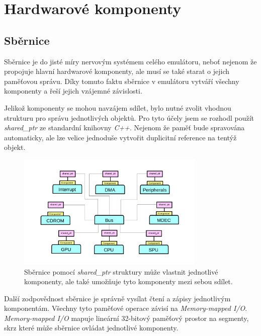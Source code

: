 \chapter{Hardwarové komponenty}

\section{Sběrnice}

Sběrnice je do jisté míry nervovým systémem celého emulátoru, neboť
nejenom že propojuje hlavní hardwarové komponenty, ale musí se také starat
o jejich paměťovou správu. Díky tomuto faktu sběrnice v emulátoru vytváří všechny komponenty
a řeší jejich vzájemné závislosti.

Jelikož komponenty se mohou navzájem sdílet, bylo nutné zvolit vhodnou strukturu
pro správu jednotlivých objektů. Pro tyto účely jsem se rozhodl použít \textit{shared\_ptr}
ze standardní knihovny \textit{C++}. Nejenom že paměť bude spravována automaticky,
ale lze velice jednoduše vytvořit duplicitní reference na tentýž objekt.

\begin{figure}[hbt]
	\centering
	\includegraphics[width=0.8\textwidth]{obrazky-figures/bus-ownage.png}
	\caption{Sběrnice pomocí \textit{shared\_ptr} struktury může vlastnit jednotlivé komponenty, ale také umožňuje tyto komponenty mezi sebou sdílet.}
	\label{bus-ownage}
\end{figure}

Další zodpovědnost sběrnice je správně vysílat čtení a zápisy jednotlivým komponentám.
Všechny tyto paměťové operace závisí na \textit{Memory-mapped I/O}. \textit{Memory-mapped I/O}
mapuje lineární 32-bitový paměťový prostor na segmenty, skrz které může sběrnice ovládat
jednotlivé komponenty.

